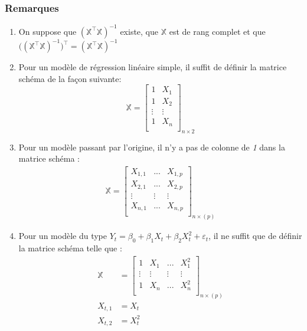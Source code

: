 \documentclass[11pt,french]{report}
\begin{document}
\subsubsection*{Remarques}
\begin{enumerate}
\item \label{remarque1} On suppose que $(\mathbb{X}^\intercal \mathbb{X})^{-1}$ existe, que $\mathbb{X}$ est de rang complet et que $\bigg((\mathbb{X}^\intercal \mathbb{X})^{-1}\bigg)^\intercal = (\mathbb{X}^\intercal \mathbb{X})^{-1}$
\item Pour un modèle de régression linéaire simple, il suffit de définir la matrice schéma de la façon suivante:
$$
\mathbb{X} = 
\begin{bmatrix} 
1 & X_{1} \\
1 & X_{2} \\
\vdots & \vdots  \\
1 &  X_{n} \\
\end{bmatrix}_{n\times 2} 
$$
\item Pour un modèle passant par l'origine, il n'y a pas de colonne de \emph{1} dans la matrice schéma :
\begin{align*}
\mathbb{X} = 
\begin{bmatrix} 
X_{1,1} & ... & X_{1,p} \\
X_{2,1} & ... & X_{2,p}  \\
\vdots & \vdots & \vdots \\
X_{n,1} & ... & X_{n,p} \\
\end{bmatrix}_{n\times (p)} 
\end{align*}
\item Pour un modèle du type $ Y_t = \beta_0 + \beta_1X_{t} + \beta_2X_{t}^2 + \varepsilon_t $, il ne suffit que de définir la matrice schéma telle que :
\begin{align*}
\mathbb{X} &= 
\begin{bmatrix} 
1 & X_{1} & ... & X_{1}^2 \\
\vdots & \vdots & \vdots & \vdots \\
1 &  X_{n} & ... & X_{n}^2 \\
\end{bmatrix}_{n\times (p)} \\
X_{t,1} &= X_t \\
X_{t,2} &= X_t^2
\end{align*}
\end{enumerate}
\end{document}
